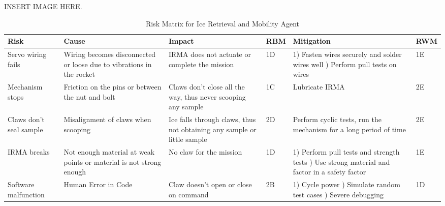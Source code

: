 			INSERT IMAGE HERE.
\begin{table}[]
            \label{IRMA}
            {\footnotesize
            \caption{Risk Matrix for Ice Retrieval and Mobility Agent}
            \centering
            \begin{tabularx}{\linewidth}{XXXlXl}
            \toprule
            \textbf{Risk}                                            & \textbf{Cause}                                                                                                                 & \textbf{Impact}                                                                                                                           & \textbf{RBM}  & \textbf{Mitigation}                                                                                                                                                                                     & \textbf{RWM} \\
            \midrule
            Servo wiring fails & Wiring becomes disconnected or loose due to vibrations in the rocket & IRMA does not actuate or complete the mission & \cellcolor{orange!25} 1D & 1) Fasten wires securely and solder wires well \newline 2) Perform pull tests on wires & \cellcolor{green!25} 1E \\
            Mechanism stops & Friction on the pins or between the nut and bolt & Claws don’t close all the way, thus never scooping any sample & \cellcolor{red!25} 1C & Lubricate IRMA & \cellcolor{green!25} 2E \\
            Claws don’t seal sample & Misalignment of claws when scooping & Ice falls through claws, thus not obtaining any sample or little sample & \cellcolor{orange!25} 2D & Perform cyclic tests, run the mechanism for a long period of time & \cellcolor{green!25} 2E \\
            IRMA breaks & Not enough material at weak points or material is not strong enough & No claw for the mission & \cellcolor{orange!25} 1D & 1) Perform pull tests and strength tests \newline 2) Use strong material and factor in a safety factor & \cellcolor{green!25} 1E \\
            Software malfunction & Human Error in Code & Claw doesn’t open or close on command & \cellcolor{red!25} 2B & 1) Cycle power \newline 2) Simulate random test cases \newline 3) Severe debugging & \cellcolor{orange!25} 1D \\
            \bottomrule
            \end{tabularx}
            }
        \end{table}

